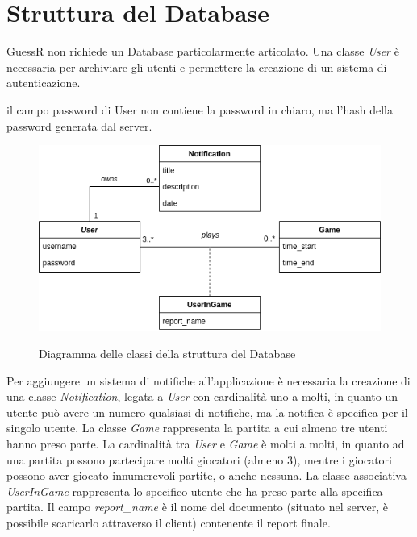 \section{Struttura del Database}
GuessR non richiede un Database particolarmente articolato.\newline
Una classe \textit{User} è necessaria per archiviare gli utenti e permettere la creazione di un sistema di autenticazione.
\begin{warn}[ATTENTZIONE:]
il campo password di User non contiene la password in chiaro, ma l'hash della password generata dal server.
\end{warn}
\begin{figure}[H]
    \caption{Diagramma delle classi della struttura del Database}
    \centering
    \includegraphics[width=\linewidth]{img/uml/guessr_db.png}
    \label{fig:wireframe_main_menu}
\end{figure}
Per aggiungere un sistema di notifiche all'applicazione è necessaria la creazione di una classe \textit{Notification}, legata a \textit{User} con cardinalità uno a molti, in quanto un utente può avere un numero qualsiasi di notifiche, ma la notifica è specifica per il singolo utente.\newline
La classe \textit{Game} rappresenta la partita a cui almeno tre utenti hanno preso parte. La cardinalità tra \textit{User} e \textit{Game} è molti a molti, in quanto ad una partita possono partecipare molti giocatori (almeno 3), mentre i giocatori possono aver giocato innumerevoli partite, o anche nessuna.\newline
La classe associativa \textit{UserInGame} rappresenta lo specifico utente che ha preso parte alla specifica partita. Il campo \textit{report\_name} è il nome del documento (situato nel server, è possibile scaricarlo attraverso il client) contenente il report finale.

